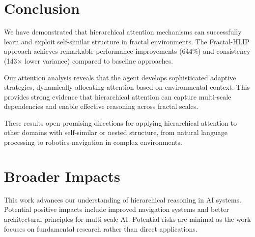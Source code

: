 \documentclass[11pt]{article}
\begin{document}
\section{Conclusion}

We have demonstrated that hierarchical attention mechanisms can successfully learn and exploit self-similar structure in fractal environments. The Fractal-HLIP approach achieves remarkable performance improvements (644\%) and consistency (143× lower variance) compared to baseline approaches.

Our attention analysis reveals that the agent develops sophisticated adaptive strategies, dynamically allocating attention based on environmental context. This provides strong evidence that hierarchical attention can capture multi-scale dependencies and enable effective reasoning across fractal scales.

These results open promising directions for applying hierarchical attention to other domains with self-similar or nested structure, from natural language processing to robotics navigation in complex environments.

\section*{Broader Impacts}

This work advances our understanding of hierarchical reasoning in AI systems. Potential positive impacts include improved navigation systems and better architectural principles for multi-scale AI. Potential risks are minimal as the work focuses on fundamental research rather than direct applications.



\end{document}
